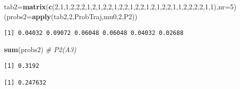 \documentclass[
]{book}
\newenvironment{Shaded}{\begin{snugshade}}{\end{snugshade}}
\newcommand{\CommentTok}[1]{\textcolor[rgb]{0.56,0.35,0.01}{\textit{#1}}}
\newcommand{\DataTypeTok}[1]{\textcolor[rgb]{0.13,0.29,0.53}{#1}}
\newcommand{\DecValTok}[1]{\textcolor[rgb]{0.00,0.00,0.81}{#1}}
\newcommand{\KeywordTok}[1]{\textcolor[rgb]{0.13,0.29,0.53}{\textbf{#1}}}
\newcommand{\NormalTok}[1]{#1}
\newcommand{\OperatorTok}[1]{\textcolor[rgb]{0.81,0.36,0.00}{\textbf{#1}}}
\theoremstyle{definition}
\theoremstyle{definition}
\theoremstyle{definition}
\theoremstyle{remark}
\begin{document}
\begin{Shaded}
\begin{Highlighting}[]
\NormalTok{tab2=}\KeywordTok{matrix}\NormalTok{(}\KeywordTok{c}\NormalTok{(}\DecValTok{2}\NormalTok{,}\DecValTok{1}\NormalTok{,}\DecValTok{1}\NormalTok{,}\DecValTok{2}\NormalTok{,}\DecValTok{2}\NormalTok{,}\DecValTok{2}\NormalTok{,}\DecValTok{1}\NormalTok{,}\DecValTok{2}\NormalTok{,}\DecValTok{1}\NormalTok{,}\DecValTok{2}\NormalTok{,}\DecValTok{2}\NormalTok{,}\DecValTok{1}\NormalTok{,}\DecValTok{2}\NormalTok{,}\DecValTok{2}\NormalTok{,}\DecValTok{1}\NormalTok{,}\DecValTok{2}\NormalTok{,}\DecValTok{2}\NormalTok{,}\DecValTok{1}\NormalTok{,}\DecValTok{2}\NormalTok{,}\DecValTok{1}\NormalTok{,}\DecValTok{2}\NormalTok{,}\DecValTok{2}\NormalTok{,}\DecValTok{1}\NormalTok{,}\DecValTok{1}\NormalTok{,}\DecValTok{2}\NormalTok{,}\DecValTok{2}\NormalTok{,}\DecValTok{2}\NormalTok{,}\DecValTok{2}\NormalTok{,}\DecValTok{1}\NormalTok{,}\DecValTok{1}\NormalTok{),}\DataTypeTok{nr=}\DecValTok{5}\NormalTok{)}
\NormalTok{(}\DataTypeTok{probs2=}\KeywordTok{apply}\NormalTok{(tab2,}\DecValTok{2}\NormalTok{,ProbTraj,mu0,}\DecValTok{2}\NormalTok{,P2))}
\end{Highlighting}
\end{Shaded}

\begin{verbatim}
[1] 0.04032 0.09072 0.06048 0.06048 0.04032 0.02688
\end{verbatim}

\begin{Shaded}
\begin{Highlighting}[]
\KeywordTok{sum}\NormalTok{(probs2)    }\CommentTok{# P2(A3)}
\end{Highlighting}
\end{Shaded}

\begin{verbatim}
[1] 0.3192
\end{verbatim}

\begin{Shaded}
\end{Shaded}

\begin{verbatim}
[1] 0.247632
\end{verbatim}
\end{document}

